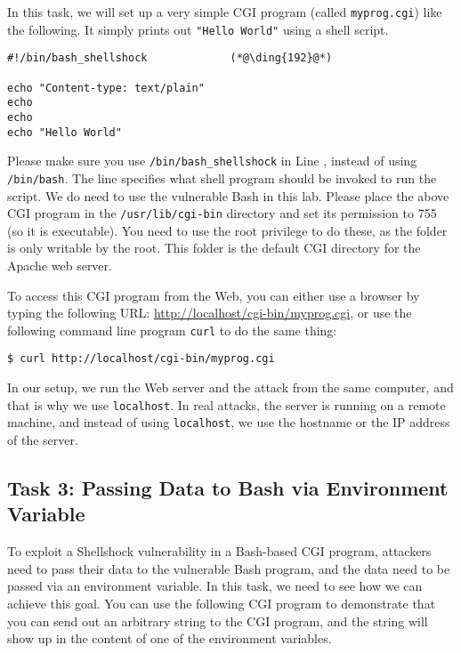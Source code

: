 In this task, we will set up a very simple CGI 
program (called \texttt{myprog.cgi}) like the
following. It simply prints out {\tt "Hello World"} using a shell script.


\begin{lstlisting}
#!/bin/bash_shellshock             (*@\ding{192}@*)

echo "Content-type: text/plain"
echo
echo
echo "Hello World"
\end{lstlisting}

Please make sure you use \texttt{/bin/bash\_shellshock} in 
Line , instead of using \texttt{/bin/bash}. The line specifies
what shell program should be invoked to run the script. We do need to use
the vulnerable Bash in this lab. Please place the above CGI program in the
\texttt{/usr/lib/cgi-bin} directory and set its permission to 755 (so it is
executable). You need to use the root privilege to do these, as the folder
is only writable by the root.  This folder is the default CGI directory for
the Apache web server. 


To access this CGI program from the Web, you can either use a browser by
typing the following URL: \url{http://localhost/cgi-bin/myprog.cgi}, or 
use the following command line program {\tt curl} to do the same thing:

\begin{lstlisting}
$ curl http://localhost/cgi-bin/myprog.cgi
\end{lstlisting}

In our setup, we run the Web server and the attack from the same computer,
and that is why we use \texttt{localhost}. In real attacks, the server is running on a remote
machine, and instead of using \texttt{localhost}, we use the hostname or the
IP address of the server. 



\subsection{Task 3: Passing Data to Bash via Environment Variable}


To exploit a Shellshock vulnerability in a Bash-based CGI program, attackers need to 
pass their data to the vulnerable Bash program, and the data need to be
passed via an environment variable. In this task, we need to see how we can
achieve this goal. You can use the following CGI program to demonstrate
that you can send out an arbitrary string to the CGI program, and the
string will show up in the content of one of the environment variables. 


